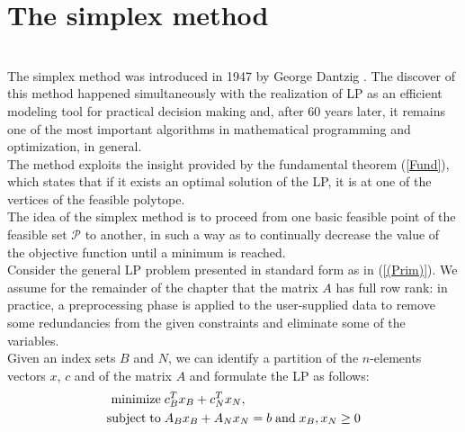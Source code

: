 \documentclass[a4paper,10 pt,titlepage,twoside]{book}
\theoremstyle{plain}
\theoremstyle{definition}
\theoremstyle{remark}
\begin{document}
\chapter{The simplex method}\\
The simplex method was introduced in 1947 by George Dantzig \cite{DAN1}. The discover of this method happened simultaneously with the realization of LP as an efficient modeling tool for practical decision making and, after 60 years later, it remains one of the most important algorithms in mathematical programming and
optimization, in general.\\
The method exploits the insight provided by the fundamental theorem
(\ref{Fund}), which states that if it exists an optimal solution of the LP, it is at one of the vertices of the feasible polytope. \\
The idea of the simplex method is to proceed from one basic feasible point of the feasible set $\mathcal{P}$ to another, in such a way as to continually decrease the value of the objective
function until a minimum is reached.\\ Consider the general LP problem presented in standard form as in (\ref{(Prim)}).
We assume for the remainder of the chapter that the matrix $A$ has full row rank: in practice, a preprocessing phase is applied to the user-supplied data to remove some
redundancies from the given constraints and eliminate some of the variables.\\Given an index sets $B$ and $N$, we can identify a partition of the $n$-elements vectors $x$, $c$ and of the matrix $A$ and formulate the LP as follows:
\begin{equation}
\begin{split}
\text{minimize\;} &c^{T}_{B}x_{B}+c^{T}_{N}x_{N},\\
\text{subject\;to\;}&A_{B}x_{B}+A_{N}x_{N} = b\text{\;and\;}x_{B}, x_{N}\geq0
\end{split}
\end{equation}
\end{document}
